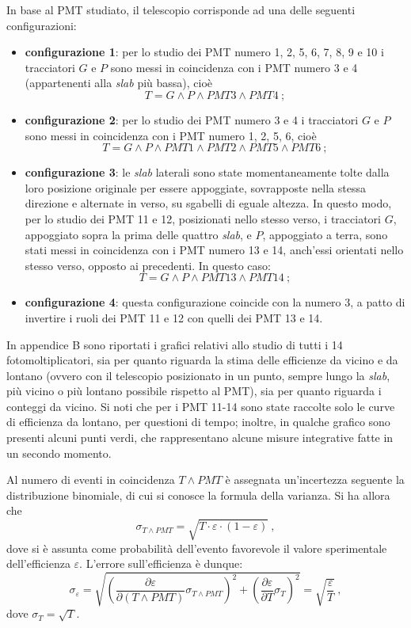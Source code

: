 \documentclass[10pt, oneside, a4paper]{article}   	%
\renewcommand{\epsilon}{\varepsilon}			%
\begin{document}
In base al PMT studiato, il telescopio corrisponde ad una delle seguenti configurazioni:
\begin{itemize}
	\item[] \textbf{configurazione 1}: per lo studio dei PMT numero 1, 2, 5, 6, 7, 8, 9 e 10 i tracciatori $G$ e $P$ sono messi in coincidenza con i PMT numero 3 e 4 (appartenenti alla \emph{slab} più bassa), cioè \[T = G\wedge P \wedge PMT3 \wedge PMT4 \ ;\]
%
	\item[] \textbf{configurazione 2}: per lo studio dei PMT numero 3 e 4 i tracciatori $G$ e $P$ sono messi in coincidenza con i PMT numero 1, 2, 5, 6, cioè \[T = G\wedge P \wedge PMT1 \wedge PMT2 \wedge PMT5 \wedge PMT6 \ ; \]
%
	\item[] \textbf{configurazione 3}: le \emph{slab} laterali sono state momentaneamente tolte dalla loro posizione originale per essere appoggiate, sovrapposte nella stessa direzione e alternate in verso, su sgabelli di eguale altezza. In questo modo, per lo studio dei PMT 11 e 12, posizionati nello stesso verso, i tracciatori $G$, appoggiato sopra la prima delle quattro \emph{slab}, e $P$, appoggiato a terra, sono stati messi in coincidenza con i PMT numero 13 e 14, anch'essi orientati nello stesso verso, opposto ai precedenti. In questo caso: \[T = G\wedge P \wedge PMT13 \wedge PMT14 \ ;\]
%
	\item[] \textbf{configurazione 4}: questa configurazione coincide con la numero 3, a patto di invertire i ruoli dei PMT 11 e 12 con quelli dei PMT 13 e 14. 
\end{itemize}
In appendice B sono riportati i grafici relativi allo studio di tutti i 14 fotomoltiplicatori, sia per quanto riguarda la stima delle efficienze da vicino e da lontano (ovvero con il telescopio posizionato in un punto, sempre lungo la \textit{slab}, più vicino o più lontano possibile rispetto al PMT), sia per quanto riguarda i conteggi da vicino. Si noti che per i PMT 11-14 sono state raccolte solo le curve di efficienza da lontano, per questioni di tempo; inoltre, in qualche grafico sono presenti alcuni punti verdi, che rappresentano alcune misure integrative fatte in un secondo momento.

Al numero di eventi in coincidenza $T\wedge PMT$ è assegnata un'incertezza seguente la distribuzione binomiale, di cui si conosce la formula della varianza.  
Si ha allora che 
\[\sigma_{T\wedge PMT} = \sqrt{T \cdot \varepsilon \cdot  (1-\varepsilon)} \ , \]
dove si è assunta come probabilità dell'evento favorevole il valore sperimentale dell'efficienza $\varepsilon$.
L'errore sull'efficienza è dunque:
$$\sigma_\epsilon=\sqrt{ \left(\frac{\partial\epsilon}{\partial (T\wedge PMT)}\sigma_{T\wedge PMT}\right)^2 + \left(\frac{\partial \epsilon}{\partial T}\sigma_T\right)^2 }=\sqrt{\frac{\epsilon}{T}} \ , $$
dove $\sigma_T = \sqrt{T}$.
\end{document}
